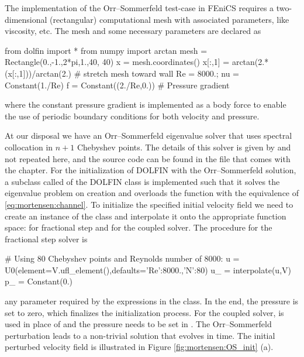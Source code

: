 The implementation of the Orr--Sommerfeld test-case in FEniCS requires
a two-dimensional (rectangular) computational mesh with associated
parameters, like viscosity, etc. The mesh and some necessary
parameters are declared as
\begin{python}
    from dolfin import *
    from numpy import arctan
    mesh = Rectangle(0.,-1.,2*pi,1.,40, 40)
    x = mesh.coordinates()
    x[:,1] = arctan(2.*(x[:,1]))/arctan(2.)  # stretch mesh toward wall
    Re = 8000.; nu = Constant(1./Re)
    f = Constant((2./Re,0.)) # Pressure gradient
\end{python}
where the constant pressure gradient is implemented as a body force to enable the use of periodic boundary conditions for both velocity and pressure.

At our disposal we have an Orr--Sommerfeld eigenvalue solver that uses
spectral collocation in $n+1$ Chebyshev points. The details of this
solver is given by \citet{Trefethen2006} and not repeated
here, and the source code can be found in the file
 that comes with the chapter. For the initialization
of DOLFIN  with the Orr--Sommerfeld solution, a subclass
called  of the DOLFIN class  is implemented
such that it solves the eigenvalue problem on creation and overloads
the  function with the equivalence of
\eqref{eq:mortensen:channel}. To initialize the specified
initial velocity field we need to create an instance of the 
class and interpolate it onto the appropriate function space: 
for fractional step and  for the coupled solver. The procedure
for the fractional step solver is
\begin{python}
    # Using 80 Chebyshev points and Reynolds number of 8000:
    u = U0(element=V.ufl_element(),defaults={'Re':8000.,'N':80})
    u_ = interpolate(u,V)
    p_ = Constant(0.)
\end{python}
any parameter required by the expressions in the  class. In
the end, the pressure is set to zero, which finalizes the
initialization process. For the coupled solver,  is used in
place of  and the pressure needs to be set in . The
Orr--Sommerfeld perturbation leads to a non-trivial solution that
evolves in time. The initial perturbed velocity field is illustrated
in Figure \ref{fig:mortensen:OS_init} (a).
